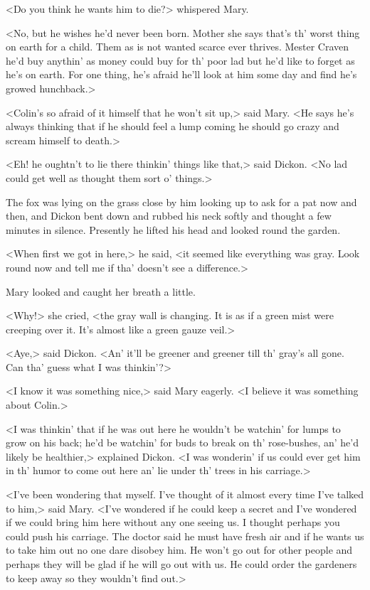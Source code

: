 <Do you think he wants him to die?> whispered Mary.

<No, but he wishes he'd never been born. Mother she says that's th' worst thing on earth for a child. Them as is not wanted scarce ever thrives. Mester Craven he'd buy anythin' as money could buy for th' poor lad but he'd like to forget as he's on earth. For one thing, he's afraid he'll look at him some day and find he's growed hunchback.>

<Colin's so afraid of it himself that he won't sit up,> said Mary. <He says he's always thinking that if he should feel a lump coming he should go crazy and scream himself to death.>

<Eh! he oughtn't to lie there thinkin' things like that,> said Dickon. <No lad could get well as thought them sort o' things.>

The fox was lying on the grass close by him looking up to ask for a pat now and then, and Dickon bent down and rubbed his neck softly and thought a few minutes in silence. Presently he lifted his head and looked round the garden.

<When first we got in here,> he said, <it seemed like everything was gray. Look round now and tell me if tha' doesn't see a difference.>

Mary looked and caught her breath a little.

<Why!> she cried, <the gray wall is changing. It is as if a green mist were creeping over it. It's almost like a green gauze veil.>

<Aye,> said Dickon. <An' it'll be greener and greener till th' gray's all gone. Can tha' guess what I was thinkin'?>

<I know it was something nice,> said Mary eagerly. <I believe it was something about Colin.>

<I was thinkin' that if he was out here he wouldn't be watchin' for lumps to grow on his back; he'd be watchin' for buds to break on th' rose-bushes, an' he'd likely be healthier,> explained Dickon. <I was wonderin' if us could ever get him in th' humor to come out here an' lie under th' trees in his carriage.>

<I've been wondering that myself. I've thought of it almost every time I've talked to him,> said Mary. <I've wondered if he could keep a secret and I've wondered if we could bring him here without any one seeing us. I thought perhaps you could push his carriage. The doctor said he must have fresh air and if he wants us to take him out no one dare disobey him. He won't go out for other people and perhaps they will be glad if he will go out with us. He could order the gardeners to keep away so they wouldn't find out.>

